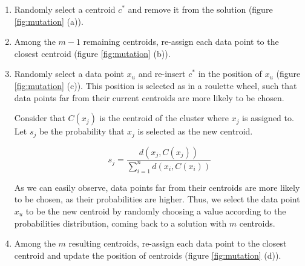 \begin{enumerate}

	\item Randomly select a centroid $c^{*}$ and remove it from the solution (figure \ref{fig:mutation} (a)).
	
	\item Among the $m-1$ remaining centroids, re-assign each data point to the closest centroid (figure \ref{fig:mutation} (b)).
	
	\item Randomly select a data point $x_u$ and re-insert $c^{*}$ in the position of $x_u$ (figure \ref{fig:mutation} (c)). This position is selected as in a roulette wheel, such that data points far from their current centroids are more likely to be chosen.
	
	
	Consider that $C(x_j)$ is the centroid of the cluster where $x_j$ is assigned to. Let $s_j$ be the probability that $x_j$ is selected as the new centroid.

	\begin{equation}
	s_j = \frac{d(x_j, C(x_j))}{\sum_{i=1}^{n}d(x_i, C(x_i))}
	\end{equation}
	
	
	
	

	As we can easily observe, data points far from their centroids are more likely to be chosen, as their probabilities are higher. Thus, we select the data point $x_u$ to be the new centroid by randomly choosing a value according to the probabilities distribution, coming back to a solution with $m$ centroids.
	
	\item Among the $m$ resulting centroids, re-assign each data point to the closest centroid and update the position of centroids (figure \ref{fig:mutation} (d)).
		
\end{enumerate}

